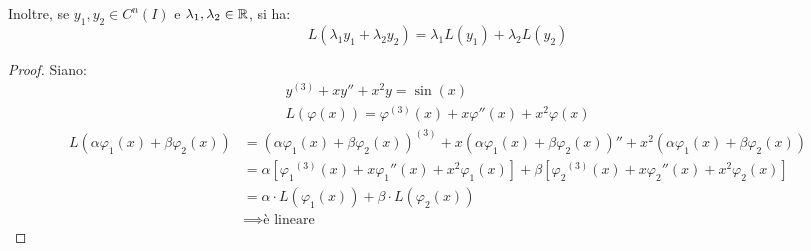 Inoltre, se \(y_1, y_2 \in C^n(I)\) e \(\lambda_1, \lambda_2 \in \mathbb{R} \), si ha:
\[
    L(\lambda_1 y_1 + \lambda_2 y_2) = \lambda_1 L(y_1) + \lambda_2 L(y_2)
\]

\begin{proof}
    Siano:
    \begin{align*}
        y^{(3)} + xy'' + x^2y = \sin(x) \\
        L(\varphi(x)) = \varphi^{(3)}(x) + x\varphi''(x) + x^2\varphi(x)
    \end{align*}
    \begin{align*}
        L(\alpha\varphi_1(x) + \beta\varphi_2(x)) & = {(\alpha\varphi_1(x) + \beta\varphi_2(x))}^{(3)} + x{(\alpha\varphi_1(x) + \beta\varphi_2(x))}'' + x^2(\alpha\varphi_1(x) + \beta\varphi_2(x))                       \\
                                                  & = \alpha \left[ {\varphi_1}^{(3)}(x) + x {\varphi_1}''(x) + x^2\varphi_1(x) \right] + \beta \left[ {\varphi_2}^{(3)}(x) + x {\varphi_2}''(x) + x^2\varphi_2(x) \right] \\
                                                  & = \alpha \cdot L(\varphi_1(x)) + \beta \cdot L(\varphi_2(x))                                                                                                           \\
                                                  & \implies \text{è lineare}
    \end{align*}
\end{proof}
